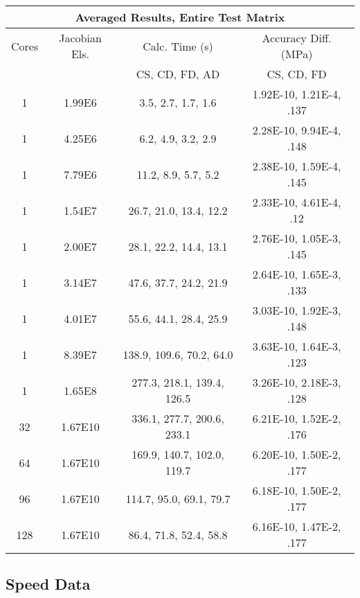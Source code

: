 \documentclass[preprint,12pt]{elsarticle}
\begin{document}
\begin{center}
    \begin{tabular}{c c c c }
    \hline
    \multicolumn{4}{c}{Averaged Results, Entire Test Matrix} \\ \hline
    Cores & Jacobian Els. & Calc. Time (s) & Accuracy Diff. (MPa)\\ 
    \multicolumn{2}{c}{} & CS, CD, FD, AD & CS, CD, FD \\ \hline 
	1 & 1.99E6  & 3.5, 2.7, 1.7, 1.6 & 1.92E-10, 1.21E-4, .137 \\ \hline
	1 & 4.25E6  & 6.2, 4.9, 3.2, 2.9 & 2.28E-10, 9.94E-4, .148 \\ \hline
	1 & 7.79E6  & 11.2, 8.9, 5.7, 5.2 & 2.38E-10, 1.59E-4, .145\\ \hline
	1 & 1.54E7  & 26.7, 21.0, 13.4, 12.2 & 2.33E-10, 4.61E-4, .12 \\ \hline
	1 & 2.00E7  & 28.1, 22.2, 14.4, 13.1 & 2.76E-10, 1.05E-3, .145 \\ \hline
	1 & 3.14E7  & 47.6, 37.7, 24.2, 21.9 & 2.64E-10, 1.65E-3, .133 \\ \hline
	1 & 4.01E7  & 55.6, 44.1, 28.4, 25.9 & 3.03E-10, 1.92E-3, .148 \\ \hline
	1 & 8.39E7  & 138.9, 109.6, 70.2, 64.0 & 3.63E-10, 1.64E-3, .123 \\ \hline
	1 & 1.65E8  & 277.3, 218.1, 139.4, 126.5 & 3.26E-10, 2.18E-3, .128 \\ \hline
	32 & 1.67E10  & 336.1, 277.7, 200.6, 233.1 & 6.21E-10, 1.52E-2, .176 \\ \hline
	64 & 1.67E10  & 169.9, 140.7, 102.0, 119.7 & 6.20E-10, 1.50E-2, .177 \\ \hline
	96 & 1.67E10  & 114.7, 95.0, 69.1, 79.7 & 6.18E-10, 1.50E-2, .177 \\ \hline
	128 & 1.67E10  & 86.4, 71.8, 52.4, 58.8 & 6.16E-10, 1.47E-2, .177 \\ \hline
    \end{tabular}
\end{center}

\subsection{Speed Data}
\begin{figure}[h]

\begin{flushleft}
{\color[rgb]{0,0,0} }

\end{flushleft}
\end{figure}
\end{document}
